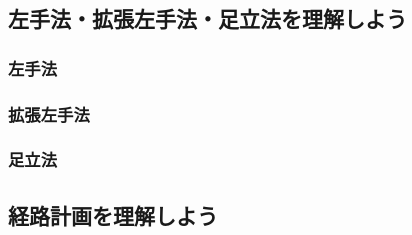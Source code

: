 \documentclass[11pt,a4paper]{jsarticle}
\begin{document}
\newpage
\subsection{左手法・拡張左手法・足立法を理解しよう}
\subsubsection{左手法}



\newpage
\subsubsection{拡張左手法}



\subsubsection{足立法}





\newpage
\subsection{経路計画を理解しよう}



%


\begin{thebibliography}{99}
\end{thebibliography}%
%
\end{document}
